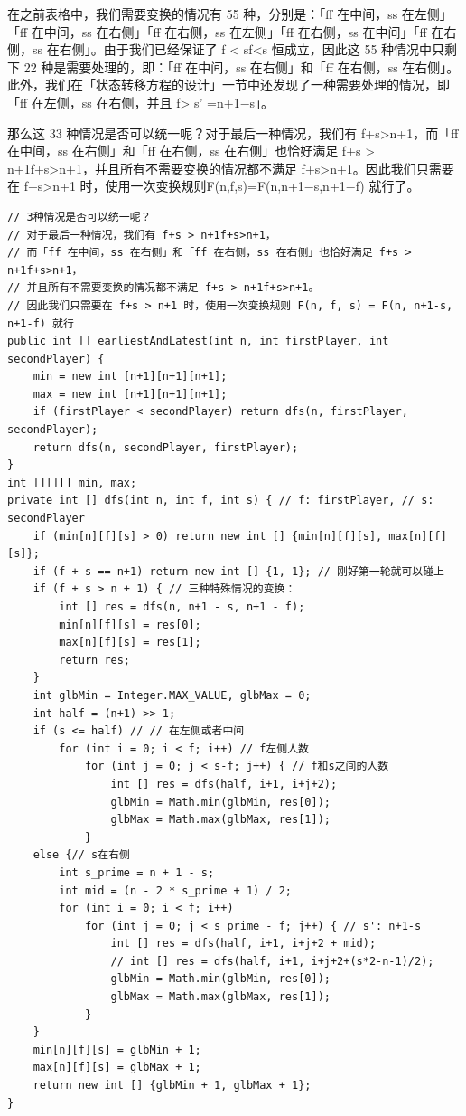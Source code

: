 \documentclass[9pt, b5paaper]{book}
\begin{document}
\begin{enumerate}
\begin{enumerate}
在之前表格中，我们需要变换的情况有 55 种，分别是：「ff 在中间，ss 在左侧」「ff 在中间，ss 在右侧」「ff 在右侧，ss 在左侧」「ff 在右侧，ss 在中间」「ff 在右侧，ss 在右侧」。由于我们已经保证了 f < sf<s 恒成立，因此这 55 种情况中只剩下 22 种是需要处理的，即：「ff 在中间，ss 在右侧」和「ff 在右侧，ss 在右侧」。此外，我们在「状态转移方程的设计」一节中还发现了一种需要处理的情况，即「ff 在左侧，ss 在右侧，并且 f> s' =n+1−s」。

那么这 33 种情况是否可以统一呢？对于最后一种情况，我们有 f+s>n+1，而「ff 在中间，ss 在右侧」和「ff 在右侧，ss 在右侧」也恰好满足 f+s > n+1f+s>n+1，并且所有不需要变换的情况都不满足 f+s>n+1。因此我们只需要在 f+s>n+1 时，使用一次变换规则F(n,f,s)=F(n,n+1−s,n+1−f) 就行了。

\begin{verbatim}
// 3种情况是否可以统一呢？
// 对于最后一种情况，我们有 f+s > n+1f+s>n+1，
// 而「ff 在中间，ss 在右侧」和「ff 在右侧，ss 在右侧」也恰好满足 f+s > n+1f+s>n+1，
// 并且所有不需要变换的情况都不满足 f+s > n+1f+s>n+1。
// 因此我们只需要在 f+s > n+1 时，使用一次变换规则 F(n, f, s) = F(n, n+1-s, n+1-f) 就行
public int [] earliestAndLatest(int n, int firstPlayer, int secondPlayer) {
    min = new int [n+1][n+1][n+1];
    max = new int [n+1][n+1][n+1];
    if (firstPlayer < secondPlayer) return dfs(n, firstPlayer, secondPlayer);
    return dfs(n, secondPlayer, firstPlayer);
}
int [][][] min, max;
private int [] dfs(int n, int f, int s) { // f: firstPlayer, // s: secondPlayer
    if (min[n][f][s] > 0) return new int [] {min[n][f][s], max[n][f][s]};
    if (f + s == n+1) return new int [] {1, 1}; // 刚好第一轮就可以碰上
    if (f + s > n + 1) { // 三种特殊情况的变换：
        int [] res = dfs(n, n+1 - s, n+1 - f);
        min[n][f][s] = res[0];
        max[n][f][s] = res[1];
        return res;
    }
    int glbMin = Integer.MAX_VALUE, glbMax = 0;
    int half = (n+1) >> 1;
    if (s <= half) // // 在左侧或者中间
        for (int i = 0; i < f; i++) // f左侧人数
            for (int j = 0; j < s-f; j++) { // f和s之间的人数
                int [] res = dfs(half, i+1, i+j+2);
                glbMin = Math.min(glbMin, res[0]);
                glbMax = Math.max(glbMax, res[1]);
            }
    else {// s在右侧
        int s_prime = n + 1 - s;
        int mid = (n - 2 * s_prime + 1) / 2;
        for (int i = 0; i < f; i++) 
            for (int j = 0; j < s_prime - f; j++) { // s': n+1-s
                int [] res = dfs(half, i+1, i+j+2 + mid);
                // int [] res = dfs(half, i+1, i+j+2+(s*2-n-1)/2);
                glbMin = Math.min(glbMin, res[0]);
                glbMax = Math.max(glbMax, res[1]); 
            }
    }
    min[n][f][s] = glbMin + 1;
    max[n][f][s] = glbMax + 1;
    return new int [] {glbMin + 1, glbMax + 1};
}
\end{verbatim}
\end{enumerate}
\end{enumerate}
\end{document}
